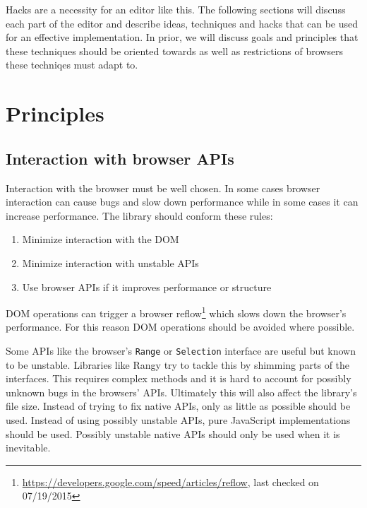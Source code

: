 Hacks are a necessity for an editor like this. The following sections will discuss each part of the editor and describe ideas, techniques and hacks that can be used for an effective implementation. In prior, we will discuss goals and principles that these techniques should be oriented towards as well as restrictions of browsers these techniqes must adapt to. %




\chapter{Principles}

\section{Interaction with browser APIs}
\label{sec:interaction_with_browser_apis}

Interaction with the browser must be well chosen. In some cases browser interaction can cause bugs and slow down performance while in some cases it can increase performance. The library should conform these rules:

\begin{enumerate} 
\item Minimize interaction with the DOM
\item Minimize interaction with unstable APIs
\item Use browser APIs if it improves performance or structure
\end{enumerate}

DOM operations can trigger a browser reflow\footnote{\url{https://developers.google.com/speed/articles/reflow}, last checked on 07/19/2015} which slows down the browser's performance. For this reason DOM operations should be avoided where possible.

Some APIs like the browser's \texttt{Range} or \texttt{Selection} interface are useful but known to be unstable. Libraries like Rangy try to tackle this by shimming parts of the interfaces. This requires complex methods and it is hard to account for possibly unknown bugs in the browsers' APIs. Ultimately this will also affect the library's file size. Instead of trying to fix native APIs, only as little as possible should be used. Instead of using possibly unstable APIs, pure JavaScript implementations should be used. Possibly unstable native APIs should only be used when it is inevitable.

